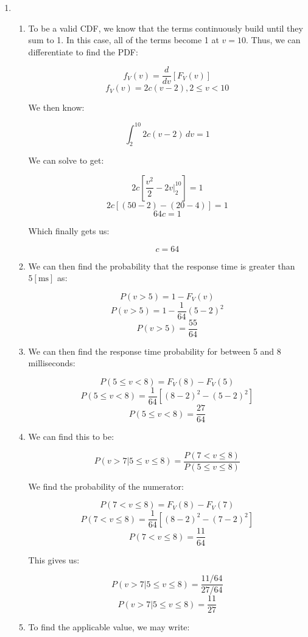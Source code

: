 \begin{enumerate}

  \item

    \begin{enumerate}

      \item To be a valid CDF, we know that the terms continuously build until they sum to 1. In this case, all of the terms become 1 at $v=10$. Thus, we can differentiate to find the PDF:

        $$f_V(v)=\frac{d}{dv}[F_V(v)]$$
        $$f_V(v)=2c(v-2), 2\leq v<10$$

        We then know:

        $$\int_2^{10} 2c(v-2)\,dv=1$$

        We can solve to get:

        $$2c\left[ \frac{v^2}{2}-2v\Big|_2^{10} \right]=1$$
        $$2c\left[ (50-2)-(20-4) \right]=1$$
        $$64c=1$$

        Which finally gets us:

        $$\boxed{c=64}$$

      \item We can then find the probability that the response time is greater than $5[\si{\milli\second}]$ as:

        $$P(v>5)=1-F_V(v)$$
        $$P(v>5)=1-\frac{1}{64}(5-2)^2$$
        $$\boxed{P(v>5)=\frac{55}{64}}$$

      \item We can then find the response time probability for between 5 and 8 milliseconds:

        $$P(5\leq v<8)=F_V(8)-F_V(5)$$
        $$P(5\leq v<8)=\frac{1}{64}[(8-2)^2-(5-2)^2]$$
        $$\boxed{P(5\leq v<8)=\frac{27}{64}}$$

      \item We can find this to be:

        $$P(v>7|5\leq v\leq8)=\frac{P(7<v\leq 8)}{P(5\leq v\leq 8)}$$

        We find the probability of the numerator:

        $$P(7<v\leq 8)=F_V(8)-F_V(7)$$
        $$P(7<v\leq 8)=\frac{1}{64}[(8-2)^2-(7-2)^2]$$
        $$P(7<v\leq 8)=\frac{11}{64}$$

        This gives us:

        $$P(v>7|5\leq v\leq8)=\frac{11/64}{27/64}$$
        $$\boxed{P(v>7|5\leq v\leq8)=\frac{11}{27}}$$

      \item To find the applicable value, we may write:


\end{enumerate}
\end{enumerate}
